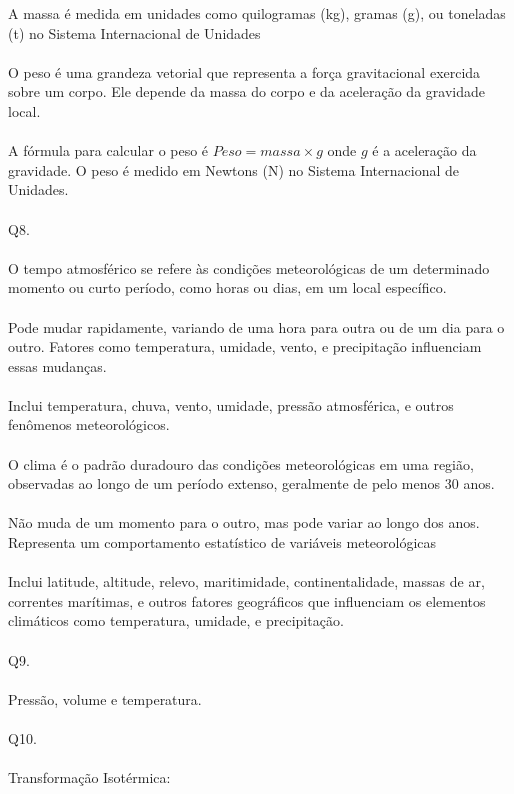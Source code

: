 \documentclass[a4paper,14pt]{article}
\begin{document}
	A massa é medida em unidades como quilogramas (kg), gramas (g), ou toneladas (t) no Sistema Internacional de Unidades \\\\
	O peso é uma grandeza vetorial que representa a força gravitacional exercida sobre um corpo. Ele depende da massa do corpo e da aceleração da gravidade local. \\\\
	A fórmula para calcular o peso é $Peso = massa \times g$ onde $g$ é a aceleração da gravidade. O peso é medido em Newtons (N) no Sistema Internacional de Unidades. \\\\
	Q8. \\\\
	O tempo atmosférico se refere às condições meteorológicas de um determinado momento ou curto período, como horas ou dias, em um local específico. \\\\
	Pode mudar rapidamente, variando de uma hora para outra ou de um dia para o outro. Fatores como temperatura, umidade, vento, e precipitação influenciam essas mudanças. \\\\
	Inclui temperatura, chuva, vento, umidade, pressão atmosférica, e outros fenômenos meteorológicos. \\\\
	O clima é o padrão duradouro das condições meteorológicas em uma região, observadas ao longo de um período extenso, geralmente de pelo menos 30 anos. \\\\
	Não muda de um momento para o outro, mas pode variar ao longo dos anos. Representa um comportamento estatístico de variáveis meteorológicas \\\\
	Inclui latitude, altitude, relevo, maritimidade, continentalidade, massas de ar, correntes marítimas, e outros fatores geográficos que influenciam os elementos climáticos como temperatura, umidade, e precipitação.\\\\
	
	\noindent Q9. \\\\
	Pressão, volume e temperatura. \\\\
	
	\noindent Q10. \\\\
	Transformação Isotérmica: \\
	
\end{document}
